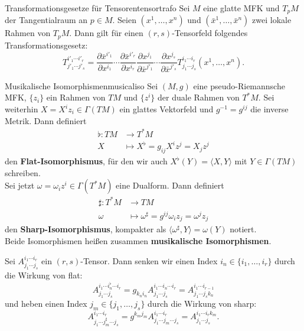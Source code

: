 \begin{satz}{Transformationsgesetze für Tensoren}{tensortrafo}
Sei $M$ eine glatte MFK und $T_pM$ der Tangentialraum an $p \in M$. Seien $(x^1, \dots, x^n)$ und $(\bar{x}^1, \dots, \bar{x}^n)$ zwei lokale Rahmen von $T_pM$. Dann gilt für einen $(r,s)$-Tensorfeld folgendes Transformationsgesetz:
\begin{equation}
T^{i'_1 \cdots i'_r}_{j'_1 \cdots j'_s} = \frac{\partial \bar{x}^{i'_1}}{\partial x^{i_1}} \cdots \frac{\partial \bar{x}^{i'_r}}{\partial x^{i_r}}\frac{\partial x^{j_1}}{\partial \bar{x}^{j'_1}} \cdots \frac{\partial x^{j_s}}{\partial \bar{x}^{j'_s}}T^{i_1 \cdots i_r}_{j_1 \cdots j_s} (x^1, \dots, x^n).
\end{equation}
\end{satz}
\begin{definition}{Musikalische Isomorphismen}{musicaliso}
Sei $(M,g)$ eine pseudo-Riemannsche MFK, $\{z_i\}$ ein Rahmen von $TM$ und $\{z^i\}$ der duale Rahmen von $T^\ast M$. Sei weiterhin $X = X^iz_i \in \Gamma(TM)$ ein glattes Vektorfeld und $g^{-1} = g^{ij}$ die inverse Metrik. Dann definiert 
\begin{align}
\flat: TM &\to T^\ast M\\
X &\mapsto X^\flat = g_{ij} X^i z^j = X_j z^j
\end{align}
den \textbf{Flat-Isomorphismus}, für den wir auch $X^\flat(Y)=\langle X, Y \rangle$ mit $Y \in \Gamma(TM)$ schreiben.\\
Sei jetzt $\omega = \omega_iz^i \in \Gamma(T^\ast M)$ eine Dualform. Dann definiert
\begin{align}
\sharp: T^\ast M &\to TM \\
\omega &\mapsto \omega^\sharp = g^{ij}\omega_iz_j = \omega^j z_j
\end{align}
den \textbf{Sharp-Isomorphismus}, kompakter als $\langle \omega^\sharp, Y \rangle = \omega(Y)$ notiert.\\
Beide Isomorphismen heißen zusammen \textbf{musikalische Isomorphismen}.
\end{definition}
\begin{bemerkung}
Sei $A^{i_1 \cdots i_r}_{j_1 \cdots j_s}$ ein $(r,s)$-Tensor. Dann senken wir einen Index $i_n \in \{i_1, \dots, i_r\}$ durch die Wirkung von flat:
\begin{equation}
A^{i_1 \cdots i^\flat_n \cdots i_r}_{j_1 \cdots j_s} = g_{k_ni_n} A^{i_1 \cdots i_n \cdots i_r}_{j_1 \cdots j_s} = A^{i_1 \cdots i_{r-1}}_{j_1 \cdots j_{s} k_{n}}
\end{equation}
und heben einen Index $j_m \in \{j_1, \dots, j_s\}$ durch die Wirkung von sharp:
\begin{equation}
A^{i_1 \cdots i_r}_{j_1 \cdots j^\sharp_m \cdots j_s} = g^{k_mj_m} A^{i_1 \cdots i_r}_{j_1 \cdots j_m \cdots j_s} = A^{i_1 \cdots i_r k_m}_{j_1 \cdots j_s}.
\end{equation}
\end{bemerkung}
